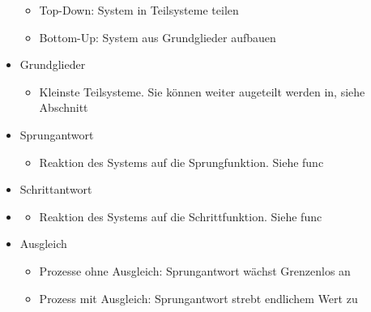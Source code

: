 \documentclass[margin=normal]{tex/hsrzf}
\begin{document}
\begin{itemize}
\begin{itemize}
                  \item Top-Down: System in Teilsysteme teilen
                  \item Bottom-Up: System aus Grundglieder aufbauen
            \end{itemize}
      \item Grundglieder
            \begin{itemize}
                  \item Kleinste Teilsysteme. Sie können weiter augeteilt werden in, siehe Abschnitt 
            \end{itemize}
      \item Sprungantwort
            \begin{itemize}
                  \item Reaktion des Systems auf die Sprungfunktion. Siehe \refname{func}

            \end{itemize}
      \item Schrittantwort
      \item \begin{itemize}
                  \item Reaktion des Systems auf die Schrittfunktion. Siehe \refname{func}
            \end{itemize}
      \item Ausgleich
            \begin{itemize}
                  \item Prozesse ohne Ausgleich: Sprungantwort wächst Grenzenlos an
                  \item Prozess mit Ausgleich: Sprungantwort strebt endlichem Wert zu
            \end{itemize}

\end{itemize}
\end{document}
